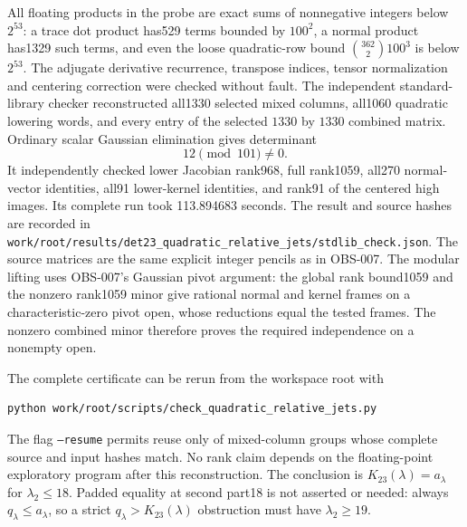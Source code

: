 All floating products in the probe are exact sums of nonnegative
integers below $2^{53}$: a trace dot product has529 terms bounded by
$100^2$, a normal product has1329 such terms, and even the loose
quadratic-row bound $\binom{362}{2}100^3$ is below $2^{53}$.
The adjugate derivative recurrence, transpose indices, tensor
normalization and centering correction were checked without fault.
The independent standard-library checker reconstructed all1330
selected mixed columns, all1060 quadratic lowering words, and every
entry of the selected $1330$ by $1330$ combined matrix.  Ordinary
scalar Gaussian elimination gives determinant
\[
                         12\pmod {101}\ne0.
\]
It independently checked lower Jacobian rank968, full rank1059,
all270 normal-vector identities, all91 lower-kernel identities,
and rank91 of the centered high images.  Its complete run took
113.894683 seconds.  The result and source hashes are recorded in
\texttt{work/root/results/det23\_quadratic\_relative\_jets/stdlib\_check.json}.
The source matrices are the same explicit integer pencils as in
OBS-007.  The modular lifting uses OBS-007's Gaussian pivot argument:
the global rank bound1059 and the nonzero rank1059 minor give rational
normal and kernel frames on a characteristic-zero pivot open, whose
reductions equal the tested frames.  The nonzero combined minor
therefore proves the required independence on a nonempty open.

The complete certificate can be rerun from the workspace root with
\begin{verbatim}
python work/root/scripts/check_quadratic_relative_jets.py
\end{verbatim}
The flag \texttt{--resume} permits reuse only of mixed-column groups
whose complete source and input hashes match.  No rank claim depends
on the floating-point exploratory program after this reconstruction.
The conclusion is $K_{23}(\lambda)=a_\lambda$ for
$\lambda_2\leq18$.  Padded equality at second part18 is not asserted
or needed: always $q_\lambda\leq a_\lambda$, so a strict
$q_\lambda>K_{23}(\lambda)$ obstruction must have
$\lambda_2\geq19$.
